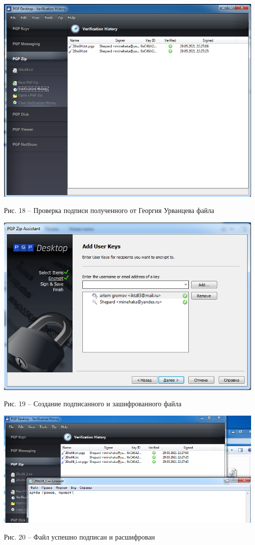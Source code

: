 \documentclass[a4paper,14pt]{extarticle}
\begin{document}
    \begin{center}
        \includegraphics[scale=0.5]{pics/18.png}

        Рис. 18 – Проверка подписи полученного от Георгия Урванцева файла
    \end{center}
    \begin{center}
        \includegraphics[scale=0.6]{pics/19.png}

        Рис. 19 – Создание подписанного и зашифрованного файла
    \end{center}
    \begin{center}
        \includegraphics[scale=0.4]{pics/21.png}

        Рис. 20 – Файл успешно подписан и расшифрован
    \end{center}
\end{document}
